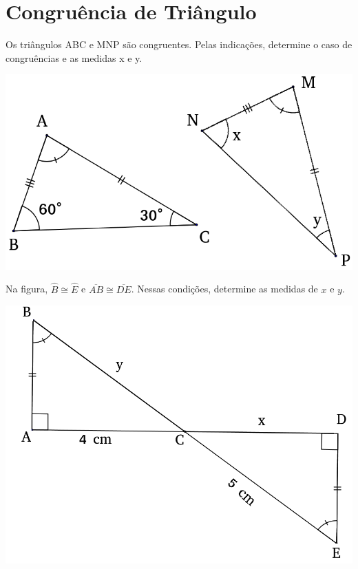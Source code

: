 		 \section{Congruência de Triângulo}	
		 	
		 		\item Os triângulos ABC e MNP são congruentes. Pelas indicações, determine o caso de congruências e as medidas x e y.	 		
		 		\begin{center}
		 		\includegraphics[scale=0.4]{figuras/fig17.png}
		 		\end{center}
		 		
		 		\item Na figura, $\widehat{B} \cong \widehat{E}$ e $\overline{AB} \cong \overline{DE}$. Nessas condições, determine as medidas de $x$ e $y$.		 		
		 		\begin{center}
		 		\includegraphics[scale=0.4]{figuras/fig18.png}
		 		\end{center}
		 		
